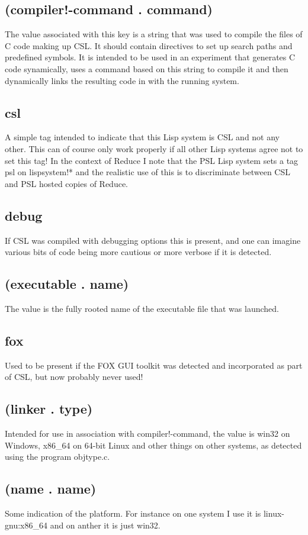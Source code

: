 \documentclass[a4paper,11pt]{article}
\begin{document}
\subsection{\ttfamily (compiler!-command . command)}
The value associated with this key is a string that was used to compile the
files of C code making up CSL. It should contain directives to set up
search paths and predefined symbols. It is intended to be used in an
experiment that generates C code synamically, uses a command based on this
string to compile it and then dynamically links the resulting code in with
the running system.
\subsection{\ttfamily csl}
A simple tag intended to indicate that this Lisp system is CSL and not any
other. This can of course only work properly if all other Lisp systems
agree not to set this tag! In the context of Reduce I note that the PSL
Lisp system sets a tag {\ttfamily psl} on {\ttfamily lispsystem!*} and
the realistic use of this is to discriminate between CSL and PSL hosted
copies of Reduce.
\subsection{\ttfamily debug}
If CSL was compiled with debugging options this is present, and one can imagine
various bits of code being more cautious or more verbose if it is detected.
\subsection{\ttfamily (executable . name)}
The value is the fully rooted name of the executable file that was launched.
\subsection{\ttfamily fox}
Used to be present if the FOX GUI toolkit was detected and incorporated as
part of CSL, but now probably never used!
\subsection{\ttfamily (linker . type)}
Intended for use in association with {\ttfamily compiler!-command}, the value
is {\ttfamily win32} on Windows, {\ttfamily x86\_64} on 64-bit Linux and
other things on other systems, as detected using the program {\ttfamily
objtype.c}.
\subsection{\ttfamily (name . name)}
Some indication of the platform. For instance on one system I use it
is {\ttfamily linux-gnu:x86\_64} and on anther it is just {\ttfamily win32}.
\end{document}
